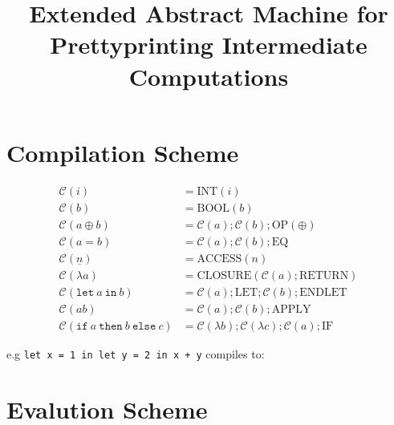 \documentclass[11pt]{article}
\begin{document}
\title{Extended Abstract Machine for Prettyprinting Intermediate Computations}
\maketitle

\section{Compilation Scheme}

\begin{align*}
\mathcal{C}(i) &= \text{INT}(i)\\
\mathcal{C}(b) &= \text{BOOL}(b)\\
\mathcal{C}(a \oplus b) &= \mathcal{C}(a); \mathcal{C}(b); \text{OP}(\oplus)\\
\mathcal{C}(a = b) &= \mathcal{C}(a); \mathcal{C}(b); \text{EQ}\\
\mathcal{C}(\underline{n}) &= \text{ACCESS}(n)\\
\mathcal{C}(\lambda a) &= \text{CLOSURE}(\mathcal{C}(a); \text{RETURN})\\
\mathcal{C}(\texttt{let}\ a\ \texttt{in}\ b) &= \mathcal{C}(a); \text{LET}; \mathcal{C}(b); \text{ENDLET}\\
\mathcal{C}(a b) &= \mathcal{C}(a); \mathcal{C}(b); \text{APPLY}\\
\mathcal{C}(\texttt{if}\ a\ \texttt{then}\ b\ \texttt{else}\ c) &= \mathcal{C}(\lambda b); \mathcal{C}(\lambda c); \mathcal{C}(a); \text{IF}
\end{align*}

e.g \texttt{let x = 1 in let y = 2 in x + y} compiles to:



\section{Evalution Scheme}
\end{document}
